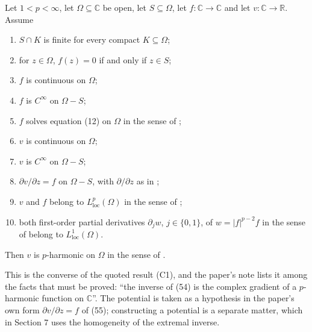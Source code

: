 \begin{lemma}
Let $1<p<\infty$, let $\Omega\subseteq\mathbb{C}$ be open, let
$S\subseteq\Omega$, let $f\colon\mathbb{C}\to\mathbb{C}$ and let
$v\colon\mathbb{C}\to\mathbb{R}$.  Assume
\begin{enumerate}
\item[(H1)] $S\cap K$ is finite for every compact $K\subseteq\Omega$;
\item[(H2)] for $z\in\Omega$, $f(z)=0$ if and only if $z\in S$;
\item[(H3)] $f$ is continuous on $\Omega$;
\item[(H4)] $f$ is $C^\infty$ on $\Omega-S$;
\item[(H5)] $f$ solves equation (12) on $\Omega$ in the sense of
  ;
\item[(H6)] $v$ is continuous on $\Omega$;
\item[(H7)] $v$ is $C^\infty$ on $\Omega-S$;
\item[(H8)] $\partial v/\partial z=f$ on $\Omega-S$, with $\partial/\partial z$
  as in ;
\item[(H9)] $v$ and $f$ belong to $L^p_{\mathrm{loc}}(\Omega)$ in the sense of
  ;
\item[(H10)] both first-order partial derivatives $\partial_j w$,
  $j\in\{0,1\}$, of $w=|f|^{p-2}f$ in the sense of 
  belong to $L^1_{\mathrm{loc}}(\Omega)$.
\end{enumerate}
Then $v$ is $p$-harmonic on $\Omega$ in the sense of .

This is the converse of the quoted result (C1), and the paper's note lists it
among the facts that must be proved: ``the inverse of (54) is the complex
gradient of a $p$-harmonic function on $\mathbb{C}$''.  The potential is taken
as a hypothesis in the paper's own form $\partial v/\partial z=f$ of (55);
constructing a potential is a separate matter, which in Section 7 uses the
homogeneity of the extremal inverse.
\end{lemma}
